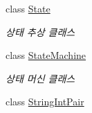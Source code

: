 \begin{DoxyCompactItemize}
class \hyperlink{class_m_c_n_1_1_state}{State}
\begin{DoxyCompactList}\small\item\em 상태 추상 클래스 \end{DoxyCompactList}\item 
class \hyperlink{class_m_c_n_1_1_state_machine}{State\+Machine}
\begin{DoxyCompactList}\small\item\em 상태 머신 클래스 \end{DoxyCompactList}\item 
class \hyperlink{class_m_c_n_1_1_string_int_pair}{String\+Int\+Pair}
\end{DoxyCompactItemize}

